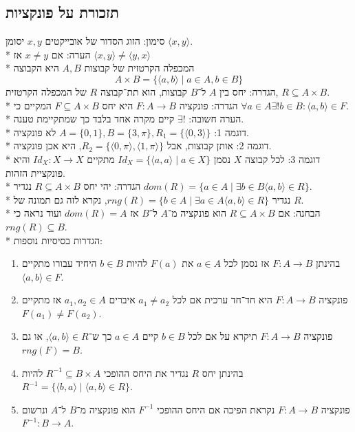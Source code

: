 \subsection{תזכורת על פונקציות}
סימון: הזוג הסדור של אובייקטים $x, y$ יסומן $\langle x, y \rangle$. \\*
הערה: אם $x \ne y$ אז $\langle x, y \rangle \ne \langle y, x\rangle$ \\*
המכפלה הקרטזית של קבוצות $A, B$ היא הקבוצה
\[
	A \times B = \{ \langle a, b \rangle \mid a \in A, b \in B \}
\]
הגדרה: יחס בין $A$ ל־$B$ קבוצות, הוא תת־קבוצה $R$ של המכפלה הקרטזית, $R \subseteq A \times B$. \\*
הגדרה: פונקציה $F : A \to B$ היא יחס $F \subseteq A \times B$ המקיים כי $\forall a \in A \exists ! b \in B : \langle a, b \rangle \in F$. \\*
הערה חשובה: $\exists! $ קיים מקרה אחד בלבד כך שמתקיימת טענה. \\*
דוגמה 1: $A = \{0, 1\}, B = \{3, \pi \}, R_1 = \{\langle 0, 3\rangle\}$ לא פונקציה. \\*
דוגמה 2: אותן קבוצות, אבל $R_2 = \{ \langle 0, \pi\rangle, \langle 1, \pi\rangle\}$, היא אכן פונקציה. \\*
דוגמה 3: לכל קבוצה $X$ נסמן $Id_X = \{ \langle a, a \rangle \mid a \in X \}$ מתקיים $Id_X : X \to X$ והיא פונקציית הזהות. \\*
הגדרה: יהי יחס $R \subseteq A \times B$ נגדיר $dom(R) = \{ a \in A \mid \exists b \in B \langle a, b\rangle \in R\}$. \\*
נגדיר $rng(R) = \{ b \in A \mid \exists a \in A \langle a, b\rangle \in R\}$, נקרא לזה גם תמונה של $R$. \\*
הבחנה: אם $R \subseteq A \times B$ הוא פונקציה מ־$A$ ל־$B$ אז $dom(R) = A$ ועוד נראה כי $rng(R) \subseteq B$. \\*
הגדרות בסיסיות נוספות:
\begin{enumerate}
	\item בהינתן $F : A \to B$ אז נסמן לכל $a \in A$ את $F(a)$ להיות $b \in B$ היחיד עבורו מתקיים $\langle a, b \rangle \in F$.
	\item פונקציה $F : A \to B$ היא חד־חד ערכית אם לכל $a_1 \ne a_2$ איברים $a_1, a_2 \in A$ אז מתקיים $F(a_1) \ne F(a_2)$.
	\item פונקציה $F: A \to B$ תיקרא על אם לכל $b \in B$ קיים $a \in A$ כך ש־$\langle a, b \rangle \in R$, או גם $rng(F) = B$.
	\item בהינתן יחס $R$ נגדיר את היחס ההופכי $R^{-1} \subseteq B \times A$ להיות $R^{-1} = \{ \langle b, a\rangle \mid \langle a, b \rangle \in R\}$.
	\item פונקציה $F : A \to B$ נקראת הפיכה אם היחס ההופכי $F^{-1}$ הוא פונקציה מ־$B$ ל־$A$ ונרשום $F^{-1} : B \to A$.
\end{enumerate}
